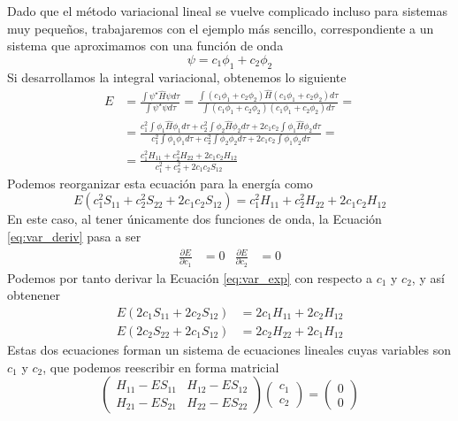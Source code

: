Dado que el método variacional lineal se vuelve complicado
incluso para sistemas muy pequeños, trabajaremos con el ejemplo
más sencillo, correspondiente a un sistema que aproximamos
con una función de onda 
\begin{equation}
    \psi=c_1\phi_1 + c_2\phi_2
\end{equation}
Si desarrollamos la integral variacional, obtenemos lo siguiente
\begin{equation}
\begin{split}
    E&=\frac{\int\psi^\star\hat{H}\psi d\tau}{\int\psi^\star\psi d\tau}  
    = \frac{\int( c_1\phi_1+ c_2\phi_2)\hat{H}(c_1\phi_1+ c_2\phi_2)d\tau}{\int (c_1\phi_1+ c_2\phi_2)(c_1\phi_ 1+ c_2\phi_2)d\tau}= \\
    &= \frac{c_1^2\int\phi_1\hat{H}\phi_1 d\tau +
    c_2^2\int\phi_2\hat{H}\phi_2 d\tau  +
    2c_1c_2\int\phi_1\hat{H}\phi_2 d\tau}
    {c_1^2\int\phi_1\phi_1 d\tau  +
    c_2^2\int\phi_2\phi_2 d\tau  +
    2c_1c_2\int\phi_1\phi_2 d\tau} = \\
    & = \frac{c_1^2H_{11} + c_2^2H_{22} + 2c_1c_2H_{12}}
    {c_1^2 + c_2^2 + 2c_1c_2S_{12}}
    \end{split}
\end{equation}
Podemos reorganizar esta ecuación para la energía como
\begin{equation}
    E(c_1^2S_{11} + c_2^2S_{22} + 2c_1c_2S_{12})=c_1^2H_{11} + c_2^2H_{22} + 2c_1c_2H_{12}
    \label{eq:var_exp}
\end{equation}
En este caso, al tener únicamente dos funciones de onda, 
la Ecuación \ref{eq:var_deriv} pasa a ser
\begin{align}
    \frac{\partial E}{\partial c_1}&=0       & \frac{\partial E}{\partial c_2}&=0
\end{align}
Podemos por tanto derivar la Ecuación \ref{eq:var_exp}
con respecto a $c_1$ y $c_2$, y así obtenener
\begin{align}
 E(2c_1S_{11} +2c_2S_{12})    &=2c_1H_{11} +2c_2H_{12} \label{eq:seq1}\\
 E(2c_2S_{22} +2c_1S_{12})    &=2c_2H_{22} +2c_1H_{12}
 \label{eq:seq2}
\end{align}
Estas dos ecuaciones forman un sistema de ecuaciones 
lineales cuyas variables son $c_1$ y $c_2$, que 
podemos reescribir en forma matricial
\begin{equation}
\begin{pmatrix}
 H_{11}-ES_{11} &  H_{12}-ES_{12}  \\ 
 H_{21}-ES_{21} &  H_{22}-ES_{22}
\end{pmatrix}
\begin{pmatrix}
c_{1}  \\ 
c_{2}
\end{pmatrix}=
\begin{pmatrix}
0\\
0
\end{pmatrix}
\end{equation}
